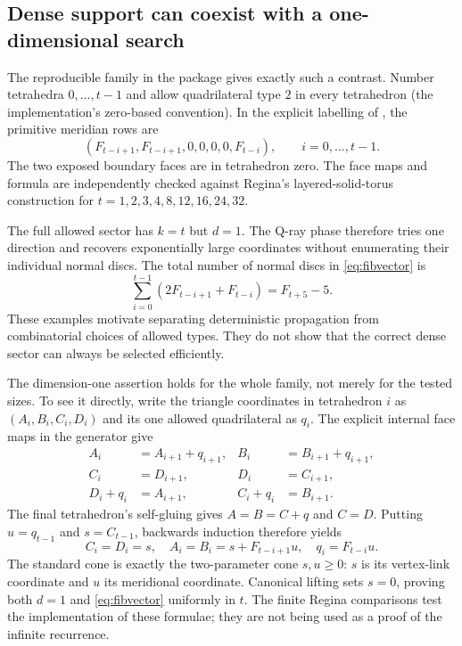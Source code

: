 \documentclass[11pt]{article}
\theoremstyle{definition}
\theoremstyle{remark}
\begin{document}
\subsection{Dense support can coexist with a one-dimensional search}

The reproducible family in the package gives exactly such a contrast. Number
tetrahedra $0,\ldots,t-1$ and allow quadrilateral type $2$ in every tetrahedron
(the implementation's zero-based convention). In the explicit labelling
of , the primitive meridian rows are
\begin{equation}
 (F_{t-i+1},F_{t-i+1},0,0,0,0,F_{t-i}),
 \qquad i=0,\ldots,t-1.
 \label{eq:fibvector}
\end{equation}
The two exposed boundary faces are in tetrahedron zero. The face maps and
formula are independently checked against Regina's layered-solid-torus
construction for $t=1,2,3,4,8,12,16,24,32$.

The full allowed sector has $k=t$ but $d=1$. The Q-ray phase therefore tries
one direction and recovers exponentially large coordinates without enumerating
their individual normal discs. The total number of normal discs in
\eqref{eq:fibvector} is
\begin{equation}
 \sum_{i=0}^{t-1}(2F_{t-i+1}+F_{t-i})=F_{t+5}-5.
 \label{eq:fibweight}
\end{equation}
These examples motivate separating deterministic propagation from
combinatorial choices of allowed types. They do not show that the correct
dense sector can always be selected efficiently.

The dimension-one assertion holds for the whole family, not merely for the
tested sizes. To see it directly, write the triangle coordinates in tetrahedron
$i$ as $(A_i,B_i,C_i,D_i)$ and its one allowed quadrilateral as $q_i$.
The explicit internal face maps in the generator give
\begin{align*}
 A_i&=A_{i+1}+q_{i+1},& B_i&=B_{i+1}+q_{i+1},\\
 C_i&=D_{i+1},& D_i&=C_{i+1},\\
 D_i+q_i&=A_{i+1},& C_i+q_i&=B_{i+1}.
\end{align*}
The final tetrahedron's self-gluing gives $A=B=C+q$ and $C=D$.
Putting $u=q_{t-1}$ and $s=C_{t-1}$, backwards induction therefore yields
\[
 C_i=D_i=s,\quad A_i=B_i=s+F_{t-i+1}u,\quad q_i=F_{t-i}u.
\]
The standard cone is exactly the two-parameter cone $s,u\ge0$: $s$ is its
vertex-link coordinate and $u$ its meridional coordinate. Canonical lifting
sets $s=0$, proving both $d=1$ and \eqref{eq:fibvector} uniformly in $t$.
The finite Regina comparisons test the implementation of these formulae;
they are not being used as a proof of the infinite recurrence.
\end{document}
